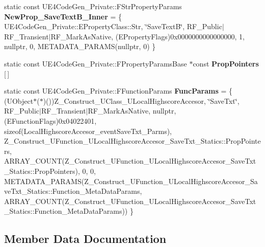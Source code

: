 \begin{DoxyCompactItemize}
\item 
\mbox{\label{struct_z___construct___u_function___u_local_highscore_accesor___save_txt___statics_a1ca00033f04c2d8a03fb7d4624f787e3}} 
static const U\+E4\+Code\+Gen\+\_\+\+Private\+::\+F\+Str\+Property\+Params {\bfseries New\+Prop\+\_\+\+Save\+Text\+B\+\_\+\+Inner} = \{ U\+E4\+Code\+Gen\+\_\+\+Private\+::\+E\+Property\+Class\+::\+Str, \char`\"{}Save\+TextB\char`\"{}, R\+F\+\_\+\+Public$\vert$R\+F\+\_\+\+Transient$\vert$R\+F\+\_\+\+Mark\+As\+Native, (E\+Property\+Flags)0x0000000000000000, 1, nullptr, 0, M\+E\+T\+A\+D\+A\+T\+A\+\_\+\+P\+A\+R\+A\+M\+S(nullptr, 0) \}
\item 
static const U\+E4\+Code\+Gen\+\_\+\+Private\+::\+F\+Property\+Params\+Base $\ast$const {\bfseries Prop\+Pointers} \mbox{[}$\,$\mbox{]}
\item 
\mbox{\label{struct_z___construct___u_function___u_local_highscore_accesor___save_txt___statics_a394edf6b90c1c0b4f35e2c83926c18ad}} 
static const U\+E4\+Code\+Gen\+\_\+\+Private\+::\+F\+Function\+Params {\bfseries Func\+Params} = \{ (U\+Object$\ast$($\ast$)())Z\+\_\+\+Construct\+\_\+\+U\+Class\+\_\+\+U\+Local\+Highscore\+Accesor, \char`\"{}Save\+Txt\char`\"{}, R\+F\+\_\+\+Public$\vert$R\+F\+\_\+\+Transient$\vert$R\+F\+\_\+\+Mark\+As\+Native, nullptr, (E\+Function\+Flags)0x04022401, sizeof(\+Local\+Highscore\+Accesor\+\_\+event\+Save\+Txt\+\_\+\+Parms), Z\+\_\+\+Construct\+\_\+\+U\+Function\+\_\+\+U\+Local\+Highscore\+Accesor\+\_\+\+Save\+Txt\+\_\+\+Statics\+::\+Prop\+Pointers, A\+R\+R\+A\+Y\+\_\+\+C\+O\+U\+N\+T(\+Z\+\_\+\+Construct\+\_\+\+U\+Function\+\_\+\+U\+Local\+Highscore\+Accesor\+\_\+\+Save\+Txt\+\_\+\+Statics\+::\+Prop\+Pointers), 0, 0, M\+E\+T\+A\+D\+A\+T\+A\+\_\+\+P\+A\+R\+A\+M\+S(\+Z\+\_\+\+Construct\+\_\+\+U\+Function\+\_\+\+U\+Local\+Highscore\+Accesor\+\_\+\+Save\+Txt\+\_\+\+Statics\+::\+Function\+\_\+\+Meta\+Data\+Params, A\+R\+R\+A\+Y\+\_\+\+C\+O\+U\+N\+T(\+Z\+\_\+\+Construct\+\_\+\+U\+Function\+\_\+\+U\+Local\+Highscore\+Accesor\+\_\+\+Save\+Txt\+\_\+\+Statics\+::\+Function\+\_\+\+Meta\+Data\+Params)) \}
\end{DoxyCompactItemize}


\subsection{Member Data Documentation}
\mbox{\label{struct_z___construct___u_function___u_local_highscore_accesor___save_txt___statics_ae295ae4a363190f7862a0bd1848bf292}} 

